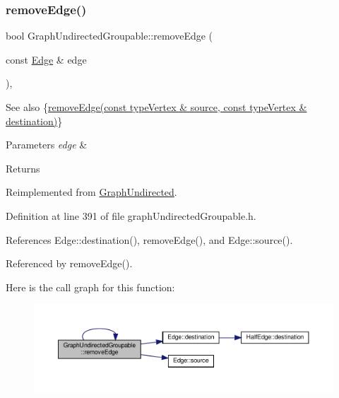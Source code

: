 \subsubsection{\texorpdfstring{remove\+Edge()}{removeEdge()}\hspace{0.1cm}{\footnotesize\ttfamily [2/2]}}
{\footnotesize\ttfamily bool Graph\+Undirected\+Groupable\+::remove\+Edge (\begin{DoxyParamCaption}\item[{const \hyperlink{classEdge}{Edge} \&}]{edge }\end{DoxyParamCaption})\hspace{0.3cm}{\ttfamily [inline]}, {\ttfamily [virtual]}}

\begin{DoxySeeAlso}{See also}
\{\hyperlink{classGraphUndirectedGroupable_ad1a488cc292d7e63d289f598aeaaacd6}{remove\+Edge(const type\+Vertex \& source, const type\+Vertex \& destination)}\} 
\end{DoxySeeAlso}

\begin{DoxyParams}{Parameters}
{\em edge} & \\
\hline
\end{DoxyParams}
\begin{DoxyReturn}{Returns}

\end{DoxyReturn}


Reimplemented from \hyperlink{classGraphUndirected_ad39275e7a8f7a39734916b8c5400a1d6}{Graph\+Undirected}.



Definition at line 391 of file graph\+Undirected\+Groupable.\+h.



References Edge\+::destination(), remove\+Edge(), and Edge\+::source().



Referenced by remove\+Edge().

Here is the call graph for this function\+:
\nopagebreak
\begin{figure}[H]
\begin{center}
\leavevmode
\includegraphics[width=350pt]{classGraphUndirectedGroupable_a88e02e4e05f304b289558922f1cb6aa1_cgraph}
\end{center}
\end{figure}
\mbox{\label{classGraphUndirectedGroupable_ad2685678f448028f17c7627634659f7c}} 
